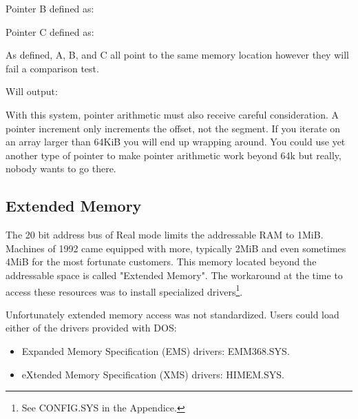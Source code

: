\documentclass[book.tex]{subfiles}
\begin{document}
\bigskip

Pointer B defined as:\\
\par
\begin{minipage}{\textwidth}

\end{minipage}

\bigskip

Pointer C defined as:\\
\par
\begin{minipage}{\textwidth}

\end{minipage}

As defined, A, B, and C all point to the same memory location however they will fail a comparison test.\\

\begin{minipage}{\textwidth}

\end{minipage}
\par
Will output:\\

\begin{minipage}{\textwidth}

\end{minipage}
\par

With this system, pointer arithmetic must also receive careful consideration. A  pointer increment only increments the offset, not the segment. If you iterate on an array larger than 64KiB you will end up wrapping around. You could use yet another type of pointer  to make pointer arithmetic work beyond 64k but really, nobody wants to go there.




  \subsection{Extended Memory}

The 20 bit address bus of Real mode limits the addressable RAM to 1MiB. Machines of 1992 came equipped with more, typically 2MiB and even sometimes 4MiB for the most fortunate customers. This memory located beyond the addressable space is called "Extended Memory". The workaround at the time to access these resources was to install specialized drivers\footnote{See CONFIG.SYS in the Appendice.}.\\
\par
Unfortunately extended memory access was not standardized. Users could load either of the drivers provided with DOS:
\begin{itemize}
\item Expanded Memory Specification (EMS) drivers: EMM368.SYS.
\item eXtended Memory Specification (XMS) drivers: HIMEM.SYS.
\end{itemize}
\end{document}
